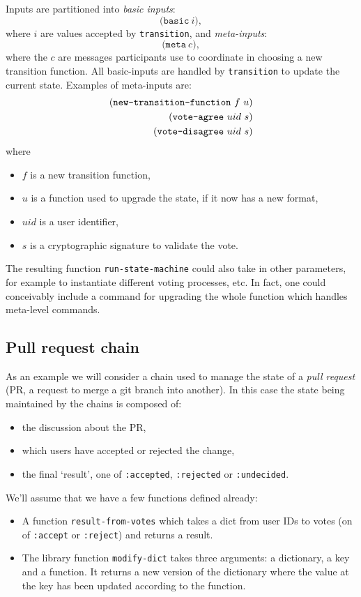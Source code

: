 Inputs are partitioned into \emph{basic inputs}:
\[
\mathtt{(basic} \ i),
\]
where $i$ are values accepted by \texttt{transition}, and \emph{meta-inputs}:
\[
\mathtt{(meta} \ c),
\]
where the $c$ are messages participants use to coordinate in choosing a new
transition function. All basic-inputs are handled by \texttt{transition}
to update the current state. Examples of meta-inputs are:
\begin{align*}
  (\text{\texttt{new-transition-function}} \ f \ u)\\
  (\text{\texttt{vote-agree}} \ uid \ s)\\
  (\text{\texttt{vote-disagree}} \ uid \ s)
\end{align*}
where
\begin{itemize}
\item $f$ is a new transition function,
\item $u$ is a function used to upgrade the state, if it now has a new format,
\item $uid$ is a user identifier,
\item $s$ is a cryptographic signature to validate the vote.
\end{itemize}
The resulting function \texttt{run-state-machine} could also take in other
parameters, for example to instantiate different voting processes, etc. In fact,
one could conceivably include a command for upgrading the whole function which
handles meta-level commands.

\subsection{Pull request chain}

As an example we will consider a chain used to manage the state of
a \emph{pull request} (PR, a request to merge a git branch into another). In this
case the state being maintained by the chains is composed of:
\begin{itemize}
  \item the discussion about the PR,
  \item which users have accepted or rejected the change,
  \item the final `result', one of \texttt{:accepted}, \texttt{:rejected} or
    \texttt{:undecided}.
\end{itemize}

We'll assume that we have a few functions defined already:
\begin{itemize}
  \item A function \texttt{result-from-votes} which takes a dict from user IDs
    to votes (on of \texttt{:accept} or \texttt{:reject}) and returns a result.
  \item The library function \texttt{modify-dict} takes three arguments: a
    dictionary, a key and a function. It returns a new version of the dictionary
    where the value at the key has been updated according to the function.
\end{itemize}

